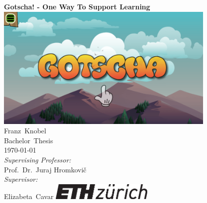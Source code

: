 \documentclass[a4paper,twoside,12pt,nochapterprefix]{scrbook}
\begin{document}
%


\newcommand{\mfytext}[0]{my fancy text}

\newcommand{\chpref}[1]{Chapter \ref{#1}}
\newcommand{\secref}[1]{Section \ref{#1}}
\newcommand{\figref}[1]{Figure \ref{#1}}
\newcommand{\tabref}[1]{Table \ref{#1}}
\newcommand{\apxref}[1]{Appendix \ref{#1}}

%
\begin{titlepage}
	\topmargin 0.5cm
	\oddsidemargin 0.0cm
	\evensidemargin 0.0cm
	\centering
	\Huge
	\vspace{1.0cm}
	\textbf{\textsf{Gotscha! - One Way To Support Learning}} \\[1.0cm]
	\includegraphics*[width=0.8\textwidth]{figures/title} \\ %
	\vspace{1cm}
	\sffamily
	\Large
	Franz\ Knobel
	\\[0.8cm]
	\large
	Bachelor\ Thesis
	\\
	\today
	\\[1.3cm]
	\emph{Supervising Professor:}\\
	Prof.\ Dr.\ Juraj Hromkovi\v c		%
	\\[0.8cm]
	\emph{Supervisor:}\\
	Elizabeta\ Cavar
	\vfill
	\includegraphics*[height=0.8cm]{figures/eth_logo_kurz_pos.eps} \hfill
	\vspace{3.4cm}
\end{titlepage}
\clearemptydoublepage
\end{document}
